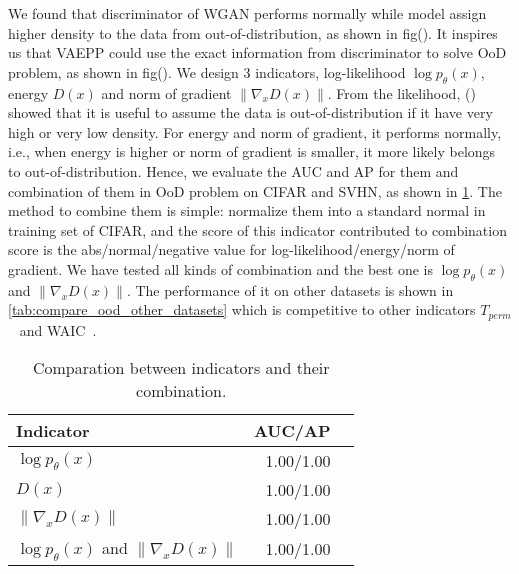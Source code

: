 We found that discriminator of WGAN performs normally while model assign higher density to the data from out-of-distribution, as shown in fig(). It inspires us that VAEPP could use the exact information from discriminator to solve OoD problem, as shown in fig(). We design 3 indicators, log-likelihood $\log p_\theta(x)$, energy $D(x)$ and norm of gradient $\|\nabla_{x} D(x)\|$. From the likelihood, () showed that it is useful to assume the data is out-of-distribution if it have very high or very low density. For energy and norm of gradient, it performs normally, i.e., when energy is higher or norm of gradient is smaller, it more likely belongs to out-of-distribution. Hence, we evaluate the AUC and AP for them and combination of them in OoD problem on CIFAR and SVHN, as shown in \cref{tab:compare_ood}. The method to combine them is simple: normalize them into a standard normal in training set of CIFAR, and the score of this indicator contributed to combination score is the abs/normal/negative value for log-likelihood/energy/norm of gradient. We have tested all kinds of combination and the best one is $\log p_\theta(x)$ and $\|\nabla_x D(x)\|$. The performance of it on other datasets is shown in \cref{tab:compare_ood_other_datasets} which is competitive to other indicators $T_{perm}$~\cite{song2017pixeldefend} and WAIC~\cite{choi2018waic}. 
\begin{table}[tb]
\centering
\begin{tabular}{lrr}  
\toprule
Indicator  & AUC/AP \\
\midrule
$\log p_\theta(x)$   &  1.00/1.00      \\
$D(x)$               &  1.00/1.00      \\
$\|\nabla_x D(x)\|$  &  1.00/1.00      \\
$\log p_\theta(x)$ and $\|\nabla_x D(x)\|$ & 1.00/1.00 \\
\bottomrule
\end{tabular}
\caption{Comparation between indicators and their combination.}
\label{tab:compare_ood}
\end{table}

